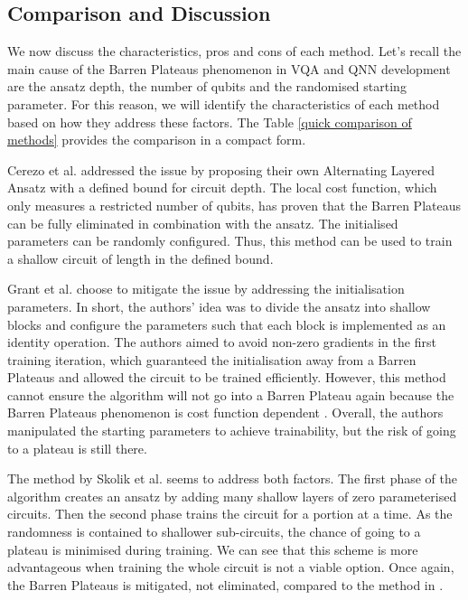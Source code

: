 \subsection{Comparison and Discussion}
We now discuss the characteristics, pros and cons of each method.
Let's recall the main cause of the Barren Plateaus phenomenon in VQA and QNN development are the ansatz depth, the number of qubits and the randomised starting parameter.
For this reason, we will identify the characteristics of each method based on how they address these factors.
The Table \ref{quick comparison of methods} provides the comparison in a compact form.

Cerezo et al. \cite{cerezoCostFunctionDependent2021} addressed the issue by proposing their own Alternating Layered Ansatz with a defined bound for circuit depth.
The local cost function, which only measures a restricted number of qubits, has proven that the Barren Plateaus can be fully eliminated in combination with the ansatz. 
The initialised parameters can be randomly configured.
Thus, this method can be used to train a shallow circuit of length in the defined bound. 

Grant et al. \cite{grantInitializationStrategyAddressing2019} choose to mitigate the issue by addressing the initialisation parameters. 
In short, the authors' idea was to divide the ansatz into shallow blocks and configure the parameters such that each block is implemented as an identity operation.
The authors aimed to avoid non-zero gradients in the first training iteration, which guaranteed the initialisation away from a Barren Plateaus and allowed the circuit to be trained efficiently.
However, this method cannot ensure the algorithm will not go into a Barren Plateau again because the Barren Plateaus phenomenon is cost function dependent \cite{cerezoCostFunctionDependent2021}.
Overall, the authors manipulated the starting parameters to achieve trainability, but the risk of going to a plateau is still there.

The method by Skolik et al. \cite{skolikLayerwiseLearningQuantum2021} seems to address both factors.
The first phase of the algorithm creates an ansatz by adding many shallow layers of zero parameterised circuits. 
Then the second phase trains the circuit for a portion at a time.
As the randomness is contained to shallower sub-circuits, the chance of going to a plateau is minimised during training.
We can see that this scheme is more advantageous when training the whole circuit is not a viable option. 
Once again, the Barren Plateaus is mitigated, not eliminated, compared to the method in \cite{cerezoCostFunctionDependent2021}.

